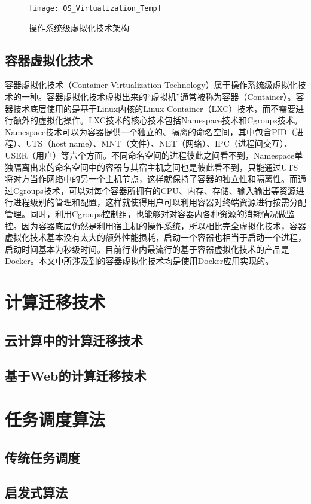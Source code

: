 \begin{figure}[!htbp]
    \centering
    \texttt{[image: OS\_Virtualization\_Temp]}
    \caption{操作系统级虚拟化技术架构}
    \label{fig:os_virtualization}
\end{figure}

\subsection{容器虚拟化技术}

容器虚拟化技术（Container Virtualization Technology）属于操作系统级虚拟化技术的一种\citep{vaughan2006new}。容器虚拟化技术虚拟出来的“虚拟机”通常被称为容器（Container）。容器技术底层使用的是基于Linux内核的Linux Container（LXC）技术，而不需要进行额外的虚拟化操作。LXC技术的核心技术包括Namespace技术和Cgroups技术。Namespace技术可以为容器提供一个独立的、隔离的命名空间，其中包含PID（进程）、UTS（host name）、MNT（文件）、NET（网络）、IPC（进程间交互）、USER（用户）等六个方面。不同命名空间的进程彼此之间看不到，Namespace单独隔离出来的命名空间中的容器与其宿主机之间也是彼此看不到，只能通过UTS将对方当作网络中的另一个主机节点，这样就保持了容器的独立性和隔离性。而通过Cgroups技术，可以对每个容器所拥有的CPU、内存、存储、输入输出等资源进行进程级别的管理和配置，这样就使得用户可以利用容器对终端资源进行按需分配管理。同时，利用Cgroups控制组，也能够对对容器内各种资源的消耗情况做监控。因为容器底层仍然是利用宿主机的操作系统，所以相比完全虚拟化技术，容器虚拟化技术基本没有太大的额外性能损耗，启动一个容器也相当于启动一个进程，启动时间基本为秒级时间。目前行业内最流行的基于容器虚拟化技术的产品是Docker\citep{liu2014research}\cite{bernstein2014containers}\cite{马晓光2017一种适用于}。本文中所涉及到的容器虚拟化技术均是使用Docker应用实现的。



\section{计算迁移技术}
\subsection{云计算中的计算迁移技术}
\subsection{基于Web的计算迁移技术}
\section{任务调度算法}
\subsection{传统任务调度}
\subsection{启发式算法}
